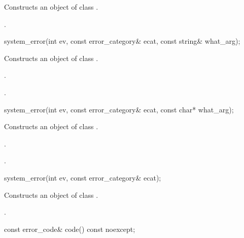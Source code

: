 \begin{itemdescr}
\pnum
\effects Constructs an object of class .

\pnum
\postconditions {}.
\end{itemdescr}

\begin{itemdecl}
system_error(int ev, const error_category& ecat,
  const string& what_arg);
\end{itemdecl}

\begin{itemdescr}
\pnum
\effects Constructs an object of class .

\pnum
\postconditions {}.

.
\end{itemdescr}

\begin{itemdecl}
system_error(int ev, const error_category& ecat,
  const char* what_arg);
\end{itemdecl}

\begin{itemdescr}
\pnum
\effects Constructs an object of class .

\pnum
\postconditions {}.

.
\end{itemdescr}

\begin{itemdecl}
system_error(int ev, const error_category& ecat);
\end{itemdecl}

\begin{itemdescr}
\pnum
\effects Constructs an object of class .

\pnum
\postconditions {}.
\end{itemdescr}

\begin{itemdecl}
const error_code& code() const noexcept;
\end{itemdecl}

